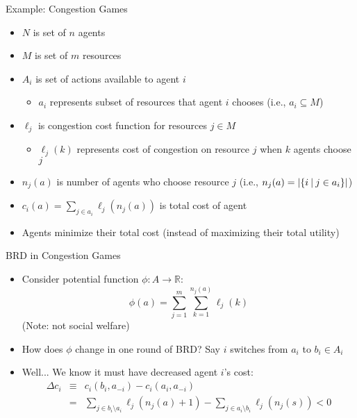 \documentclass[11pt,aspectratio=169]{beamer}
\begin{document}
  
  \begin{frame}{Example: Congestion Games}
   \begin{itemize}[<+->]
   \setlength{\itemsep}{0.7em}
    \item $N$ is set of $n$ agents
    \item $M$ is set of $m$ \alert{resources}
    \item $A_i$ is set of actions available to agent $i$
    \begin{itemize}
     \item $a_i$ represents subset of resources that agent $i$ chooses (i.e., $a_i \subseteq M$)
    \end{itemize}
    \item $\ell_j$ is \alert{congestion cost function} for resources $j \in M$
    \begin{itemize}
     \item $\ell_j(k)$ represents cost of congestion on resource $j$ when $k$ agents choose $j$
    \end{itemize}
    \item $n_j(a)$ is number of agents who choose resource $j$ (i.e., $n_j(a) = \vert\{i \:\vert\: j \in a_i\}\vert$)
    \item $c_i(a) = \sum_{j \in a_i} \ell_j(n_j(a))$ is total cost of agent
    \item Agents minimize their total cost (instead of maximizing their total utility)
   \end{itemize}
  \end{frame}
  
  
  \begin{frame}{BRD in Congestion Games}
   \begin{itemize}
    \item<1-> Consider \alert{potential function}  $\phi:A\rightarrow \mathbb{R}$:
    $$\phi(a) = \sum_{j=1}^m \sum_{k=1}^{n_j(a)} \ell_j(k)$$
    (Note: \alert{not} social welfare)
    \item<2-> How does $\phi$ change in one round of BRD? Say $i$ switches from $a_i$ to $b_i \in A_i$
    \item<3->Well... We know it must have decreased agent $i$'s cost:
    \begin{eqnarray*}
     \Delta c_i & \equiv & c_i(b_i, a_{-i}) - c_i(a_i, a_{-i}) \\ 
     & = & \sum_{j \in b_i\setminus a_i}\ell_j(n_j(a)+1) - \sum_{j \in a_i \setminus b_i}\ell_j(n_j(s)) < 0
    \end{eqnarray*}
   \end{itemize}
  \end{frame}
  
\end{document}
